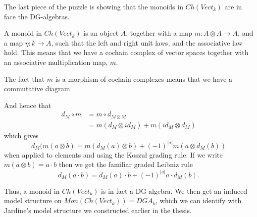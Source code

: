 The last piece of the puzzle is showing that the monoids in $Ch(Vect_k)$ are in face the DG-algebras. 

A monoid in $Ch(Vect_k)$ is an object $A$, together with a map $m\colon A\otimes A\longrightarrow A$, and a map $\eta\colon k\longrightarrow A$, such that the left and right unit laws, and the associative law hold. This means that we have a cochain complex of vector spaces together with an associative multiplication map, $m$. 

The fact that $m$ is a morphism of cochain complexes means that we have a commutative diagram
\begin{center}
\end{center}
And hence that
\begin{align*}
    d_M\circ m
    &= m\circ d_{M\otimes M} \\
    &= m(d_M\otimes id_M) + m(id_M\otimes d_M)
\end{align*}
which gives 
\begin{equation*}
    d_M(m(a\otimes b) = m(d_M(a)\otimes b) + (-1)^{|a|}m(a\otimes d_M(b))
\end{equation*}
when applied to elements and using the Koszul grading rule. If we write $m(a\otimes b) = a\cdot b$ then we get the familiar graded Leibniz rule 
\begin{equation*}
    d_M(a\cdot b) = d_M(a)\cdot b + (-1)^{|a|}a\cdot d_M(b).
\end{equation*}

Thus, a monoid in $Ch(Vect_k)$ is in fact a DG-algebra. We then get an induced model structure on $Mon(Ch(Vect_k)) = DGA_k$, which we can identify with Jardine's model structure we constructed earlier in the thesis.

